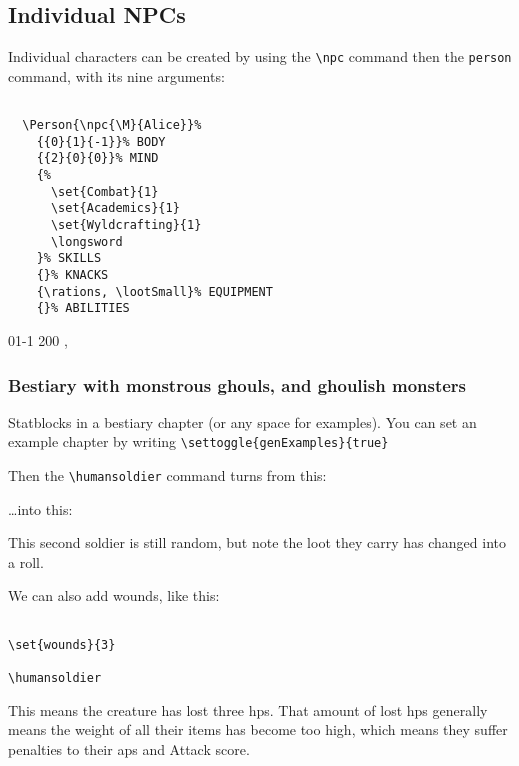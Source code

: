 \documentclass[a4paper,openany]{book}
\begin{document}
\begin{multicols}{2}

\subsection{Individual NPCs}

Individual characters can be created by using the \verb"\npc" command then the \verb"person" command, with its nine arguments:

\begin{verbatim}

  \Person{\npc{\M}{Alice}}%
    {{0}{1}{-1}}% BODY
    {{2}{0}{0}}% MIND
    {%
      \set{Combat}{1}
      \set{Academics}{1}
      \set{Wyldcrafting}{1}
      \longsword
    }% SKILLS
    {}% KNACKS
    {\rations, \lootSmall}% EQUIPMENT
    {}% ABILITIES

\end{verbatim}

%
  {{0}{1}{-1}}%
  {{2}{0}{0}}%
  {%
    \shortsword
    \partiallisk
  }%
  {}%
  {\rations, \lootSmall}%
  {}%

\subsubsection{Bestiary with monstrous ghouls, and ghoulish monsters}

Statblocks in a bestiary chapter (or any space for examples).
You can set an example chapter by writing \verb"\settoggle{genExamples}{true}"

Then the \verb"\humansoldier" command turns from this:

\humansoldier

\ldots into this:


\humansoldier

This second soldier is still random, but note the loot they carry has changed into a roll.

We can also add wounds, like this:

\begin{verbatim}

\set{wounds}{3}

\humansoldier

\end{verbatim}

This means the creature has lost three \glspl{hp}.
That amount of lost \glspl{hp} generally means the \gls{weight} of all their items has become too high, which means they suffer penalties to their \glspl{ap} and Attack score.


\end{multicols}
\end{document}
